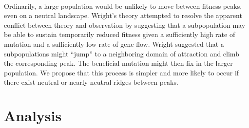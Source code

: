 \documentclass[12pt,letterpaper,titlepage]{article}
\begin{document}
\paragraph{}
Ordinarily, a large population would be unlikely to move between fitness peaks,
even on a neutral landscape. Wright's theory attempted to resolve the apparent
conflict between theory and observation by suggesting that a subpopulation may
be able to sustain temporarily reduced fitness given a sufficiently high rate
of mutation and a sufficiently low rate of gene flow. Wright suggested that a
subpopulations might ``jump'' to a neighboring domain of attraction and climb
the corresponding peak. The beneficial mutation might then fix in the larger
population. We propose that this process is simpler and more likely to occur if
there exist neutral or nearly-neutral ridges between peaks.

\section{Analysis}


{}
\end{document}
